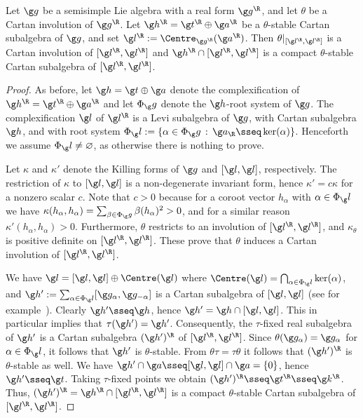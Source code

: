 \documentclass[12pt]{amsart}
\begin{document}
\begin{lem}
\label{lem:Z(a)has-cpct-Cartan}
Let $\g g$ be a semisimple Lie algebra with a real form $\g g^\R$, and let $\theta$ be a Cartan involution of $\g g^\R$.  Let $\g h^\R=\g t^\R\oplus\g a^\R$ be a $\theta$-stable Cartan subalgebra of $\g g$, and set $\g l^\R:=\Centre_{\g g^\R}(\g a^\R)$. Then $\theta|_{[\g l^\R,\g l^\R]}$ is a Cartan involution of $[\g l^\R,\g l^\R]$ and $\g h^\R\cap [\g l^\R,\g l^\R]$ is  a compact $\theta$-stable Cartan subalgebra of $[\g l^\R,\g l^\R]$. %
\end{lem}
\begin{proof}
As before, let $\g h=\g t\oplus\g a$ denote the complexification of $\g h^\R=\g t^\R\oplus\g a^\R$ and let $\Phi_\g g$ denote the $\g h$-root system of $\g g$. The complexification $\g l$ of  $\g l^\R$ is a Levi subalgebra of $\g g$, with Cartan subalgebra $\g h$, and with root system 
$
\Phi_\g l:=\{\alpha\in\Phi_\g g\,:\,\g a_\R\sseq \ker(\alpha)\}$. Henceforth we assume $\Phi_\g l\neq \varnothing$, as otherwise there is nothing to prove. 

Let $\kappa$ and $\kappa'$ denote the Killing forms of $\g g$ and $[\g l,\g l]$, respectively. The restriction of  $\kappa$ to $[\g l,\g l]$ is a non-degenerate invariant form, hence $\kappa'=c\kappa$ for a nonzero scalar $c$. Note that $c>0$ because for a coroot vector $h_\alpha$ with $\alpha\in\Phi_\g l$ we have 
$\kappa(h_\alpha,h_\alpha)=
\sum_{\beta\in\Phi_\g g}\beta(h_\alpha)^2>0$, and for a similar reason $\kappa'(h_\alpha,h_\alpha)>0$. Furthermore, $\theta$ restricts to an involution of $[\g l^\R,\g l^\R]$, and $\kappa_\theta$ is positive definite on $[\g l^\R,\g l^\R]$. These prove that $\theta$ induces a Cartan involution of $[\g l^\R,\g l^\R]$. 

We have  $\g l=[\g l,\g l]\oplus \Centre(\g l)$ where  
$\Centre(\g l)=\bigcap_{\alpha\in\Phi_\g l}\ker(\alpha)$, and  $\g h':=\sum_{\alpha\in\Phi_\g l}[\g g_\alpha,\g g_{-\alpha}]$ is a Cartan subalgebra of $[\g l,\g l]$ (see for example~\cite[Cor 5.94]{Knapp}). 
Clearly $\g h'\sseq \g h$, hence $\g h'=\g h\cap [\g l,\g l]$.
This in particular implies that $\tau(\g h')=\g h'$.
Consequently, the $\tau$-fixed real subalgebra of $\g h'$ is a Cartan subalgebra $(\g h')^\R$ of $[\g l^\R,\g l^\R]$.  
Since $\theta(\g g _\alpha)=\g g_\alpha$ for $\alpha\in\Phi_\g l$, 
it follows that $\g h'$ is $\theta$-stable. From $\theta\tau=\tau\theta$ it follows that $(\g h')^\R$ is $\theta$-stable as well.  
We have $\g h'\cap\g a\sseq [\g l,\g l]\cap \g a=\{0\}$, 
hence $\g h'\sseq \g t$. Taking $\tau$-fixed points we obtain $(\g h')^{\R}\sseq\g t^\R\sseq \g k^\R$. 
Thus, $(\g h')^\R=\g h^\R\cap[\g l^\R,\g l^\R]$ is a compact $\theta$-stable Cartan subalgebra of $[\g l^\R,\g l^\R]$. 
%
%
%



\end{proof}
\end{document}
